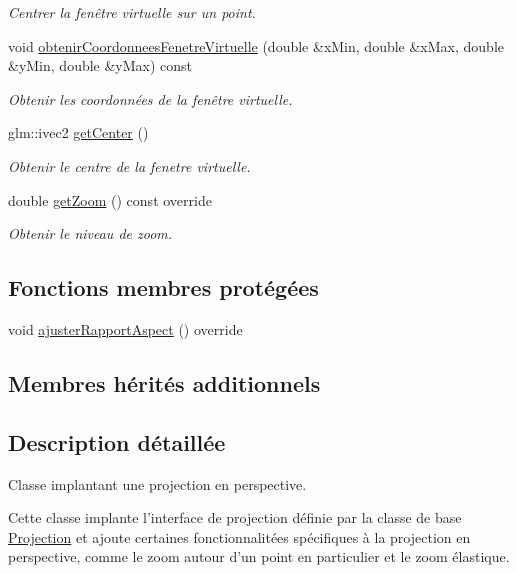 \begin{DoxyCompactItemize}
\begin{DoxyCompactList}\small\item\em Centrer la fenêtre virtuelle sur un point. \end{DoxyCompactList}\item 
void \hyperlink{classvue_1_1_projection_perspective_a8b0182992c0620d37e9669f541fca32e}{obtenir\-Coordonnees\-Fenetre\-Virtuelle} (double \&x\-Min, double \&x\-Max, double \&y\-Min, double \&y\-Max) const 
\begin{DoxyCompactList}\small\item\em Obtenir les coordonnées de la fenêtre virtuelle. \end{DoxyCompactList}\item 
glm\-::ivec2 \hyperlink{classvue_1_1_projection_perspective_a1baf16a13b0ac343a1347f1e80fb1afa}{get\-Center} ()
\begin{DoxyCompactList}\small\item\em Obtenir le centre de la fenetre virtuelle. \end{DoxyCompactList}\item 
double \hyperlink{classvue_1_1_projection_perspective_a2c77fdfe01bbf37dcee26263ade03e3b}{get\-Zoom} () const override
\begin{DoxyCompactList}\small\item\em Obtenir le niveau de zoom. \end{DoxyCompactList}\end{DoxyCompactItemize}
\subsection*{Fonctions membres protégées}
\begin{DoxyCompactItemize}
\item 
void \hyperlink{classvue_1_1_projection_perspective_a9a85676aed342a8b6d114ce92e64e242}{ajuster\-Rapport\-Aspect} () override
\end{DoxyCompactItemize}
\subsection*{Membres hérités additionnels}


\subsection{Description détaillée}
Classe implantant une projection en perspective. 

Cette classe implante l'interface de projection définie par la classe de base \hyperlink{classvue_1_1_projection}{Projection} et ajoute certaines fonctionnalitées spécifiques à la projection en perspective, comme le zoom autour d'un point en particulier et le zoom élastique.

